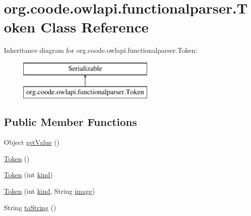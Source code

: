 \hypertarget{classorg_1_1coode_1_1owlapi_1_1functionalparser_1_1_token}{\section{org.\-coode.\-owlapi.\-functionalparser.\-Token Class Reference}
\label{classorg_1_1coode_1_1owlapi_1_1functionalparser_1_1_token}
}
Inheritance diagram for org.\-coode.\-owlapi.\-functionalparser.\-Token\-:\begin{figure}[H]
\begin{center}
\leavevmode
\includegraphics[height=2.000000cm]{classorg_1_1coode_1_1owlapi_1_1functionalparser_1_1_token}
\end{center}
\end{figure}
\subsection*{Public Member Functions}
\begin{DoxyCompactItemize}
\item 
Object \hyperlink{classorg_1_1coode_1_1owlapi_1_1functionalparser_1_1_token_af45598f93f04a3fae95494211118f268}{get\-Value} ()
\item 
\hyperlink{classorg_1_1coode_1_1owlapi_1_1functionalparser_1_1_token_a67ba045520cdc34bb22c5ca655abe88e}{Token} ()
\item 
\hyperlink{classorg_1_1coode_1_1owlapi_1_1functionalparser_1_1_token_a8096e9cf7eafc42d971273bcac267906}{Token} (int \hyperlink{classorg_1_1coode_1_1owlapi_1_1functionalparser_1_1_token_a9b9acedc3284422ee52293d9aa783da1}{kind})
\item 
\hyperlink{classorg_1_1coode_1_1owlapi_1_1functionalparser_1_1_token_ad585a14f93c082e26e15052e6cc0b498}{Token} (int \hyperlink{classorg_1_1coode_1_1owlapi_1_1functionalparser_1_1_token_a9b9acedc3284422ee52293d9aa783da1}{kind}, String \hyperlink{classorg_1_1coode_1_1owlapi_1_1functionalparser_1_1_token_a69bee38a905ebb66dd2a297ae0c3db97}{image})
\item 
String \hyperlink{classorg_1_1coode_1_1owlapi_1_1functionalparser_1_1_token_a1d284e81607dadbe8411ee49d887e410}{to\-String} ()
\end{DoxyCompactItemize}
